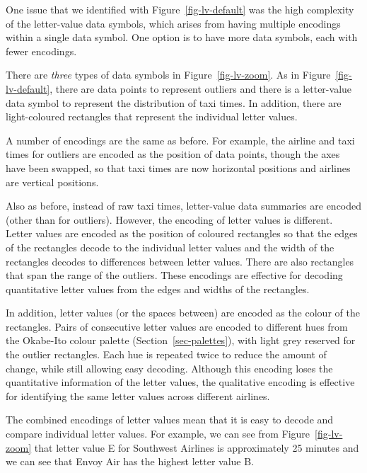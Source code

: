 \documentclass[
  letterpaper,
  DIV=11,
  numbers=noendperiod]{scrreprt}
\providecommand{\tightlist}{%
  \setlength{\itemsep}{0pt}\setlength{\parskip}{0pt}}
\begin{document}
\begin{description}
\tightlist
\item[Data symbols]
One issue that we identified with Figure~\ref{fig-lv-default} was the
high complexity of the letter-value data symbols, which arises from
having multiple encodings within a single data symbol. One option is to
have more data symbols, each with fewer encodings.
\end{description}

There are \emph{three} types of data symbols in
Figure~\ref{fig-lv-zoom}. As in Figure~\ref{fig-lv-default}, there are
data points to represent outliers and there is a letter-value data
symbol to represent the distribution of taxi times. In addition, there
are light-coloured rectangles that represent the individual letter
values.

\begin{description}
\tightlist
\item[Encoding visual features]
A number of encodings are the same as before. For example, the airline
and taxi times for outliers are encoded as the position of data points,
though the axes have been swapped, so that taxi times are now horizontal
positions and airlines are vertical positions.
\end{description}

Also as before, instead of raw taxi times, letter-value data summaries
are encoded (other than for outliers). However, the encoding of letter
values is different. Letter values are encoded as the position of
coloured rectangles so that the edges of the rectangles decode to the
individual letter values and the width of the rectangles decodes to
differences between letter values. There are also rectangles that span
the range of the outliers. These encodings are effective for decoding
quantitative letter values from the edges and widths of the rectangles.

In addition, letter values (or the spaces between) are encoded as the
colour of the rectangles. Pairs of consecutive letter values are encoded
to different hues from the Okabe-Ito colour palette
(Section~\ref{sec-palettes}), with light grey reserved for the outlier
rectangles. Each hue is repeated twice to reduce the amount of change,
while still allowing easy decoding. Although this encoding loses the
quantitative information of the letter values, the qualitative encoding
is effective for identifying the same letter values across different
airlines.

The combined encodings of letter values mean that it is easy to decode
and compare individual letter values. For example, we can see from
Figure~\ref{fig-lv-zoom} that letter value E for Southwest Airlines is
approximately 25 minutes and we can see that Envoy Air has the highest
letter value B.
\end{document}

